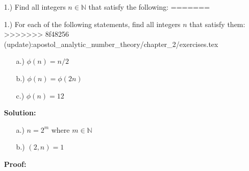 \documentclass[12pt]{article}
\newcommand{\N}{\mathbb{N}}
\newcommand{\solution}{\textbf{Solution:}}
\newcommand{\proof}{\textbf{Proof:}}
\begin{document}
    \pagestyle{fancy}

    \begin{itemize}
<<<<<<< HEAD:analytic_number_theory/chapter_2/exercises.tex
        \item[1.)] Find all integers \( n \in \N \) that satisfy the following:
=======
        \item[1.)] For each of the following statements, find all integers
        \( n \) that satisfy them:
>>>>>>> 8f48256 (update):apostol_analytic_number_theory/chapter_2/exercises.tex
        \begin{itemize}
            \item [a.)] \( \phi(n) = n / 2 \)
            \item [b.)] \( \phi(n) = \phi(2n) \)
            \item [c.)] \( \phi(n) = 12 \)
        \end{itemize}

        \solution

        \begin{itemize}
            \item [a.)] \( n = 2^m \) where \( m \in \N \)

            \item [b.)] \( (2, n) = 1 \)
        \end{itemize}

        \proof


\end{itemize}
\end{document}
